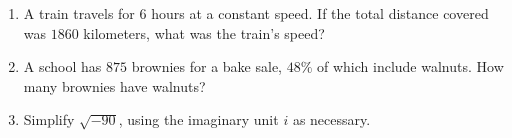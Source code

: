 \documentclass{article}
\begin{document}
\begin{enumerate}

\item A train travels for $6$ hours at a constant speed. If the total distance covered was $1860$ kilometers, what was the train's speed?

        \begin{enumerate}
        \end{enumerate}


\item A school has $875$ brownies for a bake sale, $48\%$ of which include walnuts. How many brownies have walnuts?

        \begin{enumerate}
        \end{enumerate}


\item Simplify $\sqrt{-90}$, using the imaginary unit $i$ as necessary.

        \begin{enumerate}
        \end{enumerate}



 
  

\end{enumerate}
\end{document}
